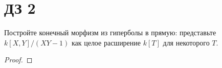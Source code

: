 \section{ДЗ 2}

\begin{prob}
Постройте конечный морфизм из гиперболы в прямую: представьте $k[X, Y] /(X Y-1)$ как целое расширение $k[T]$ для некоторого $T$.
\end{prob}
\begin{proof}

\end{proof}
\begin{comment}
https://math.stackexchange.com/questions/3570300/how-to-construct-the-intersection-of-an-hyperbola-with-a-line

\end{comment}
\vskip 0.6in





